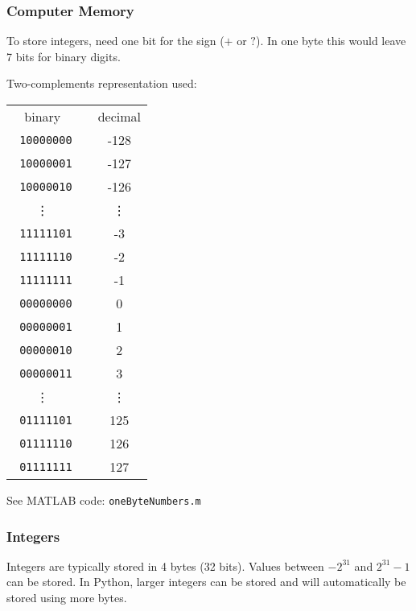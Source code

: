 \frame
{
\frametitle{Computer Memory}
To store integers, need one bit for the sign ($+$ or $?$).  In one byte this would leave 7 bits for binary digits.

Two-complements representation used:
\begin{table}[h]
\begin{center}
\begin{tabular}{ccc}
binary &  & decimal\\ 
\texttt{  10000000} &&     -128\\
\texttt{  10000001} &&     -127\\
\texttt{  10000010} &&     -126\\
\vdots && \vdots\\
\texttt{  11111101} &&       -3\\
\texttt{  11111110} &&       -2\\
\texttt{  11111111} &&       -1\\
\texttt{  00000000} &&        0\\
\texttt{  00000001} &&        1\\
\texttt{  00000010} &&        2\\
\texttt{  00000011} &&        3\\
\vdots && \vdots\\
\texttt{  01111101} &&      125\\
\texttt{  01111110} &&      126\\
\texttt{  01111111} &&      127
\end{tabular} 
\end{center}
\end{table}


See MATLAB code: \texttt{oneByteNumbers.m}


}


\frame
{
\frametitle{Integers}
Integers are typically stored in 4 bytes (32 bits). Values between  $-2^{31}$ and $2^{31}-1$ can be stored.
In Python, larger integers can be stored and will automatically be stored using more bytes.


}



